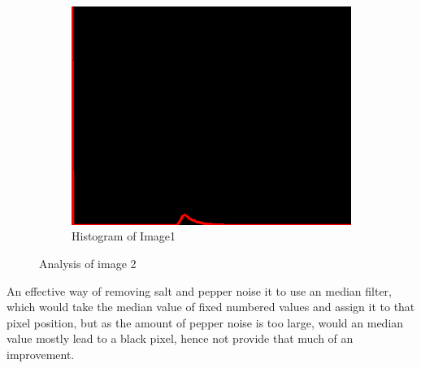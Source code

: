 \begin{figure}[H]
\begin{subfigure}[b]{0.446\textwidth}
        \includegraphics[width=\textwidth]{img1/src_hist.png}
        \caption{Histogram of Image1}
        \label{fig:img1_hist}
    \end{subfigure}
    \caption{Analysis of image 2}\label{fig:img1}
\end{figure}

An effective way of removing salt and pepper noise it to use an median filter, which would take the median value  of fixed numbered  values and assign it to that pixel position, but as the amount of pepper noise is too large, would an median value mostly lead to a black pixel, hence not provide that much of an improvement.  

